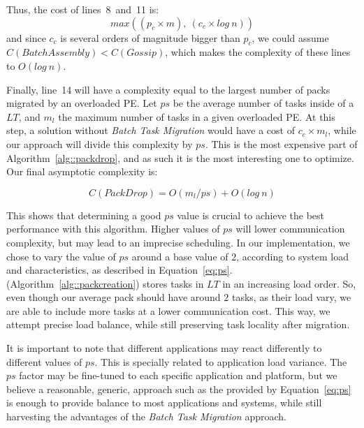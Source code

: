 Thus, the cost of lines~8~and~11 is:
\begin{equation}
 max((p_c\times m),\ (c_c\times log\ n))
\end{equation}
and since $c_c$ is several orders of magnitude bigger than $p_c$, we could assume $C(BatchAssembly)< C(Gossip)$, which makes the 
complexity of these lines to $O(log\ n)$.

Finally, line~14 will have a complexity equal to the largest number of packs migrated by an overloaded PE.
Let $ps$ be the average number of tasks inside of a $LT$, and $m_l$ the maximum number of tasks in a given overloaded PE.
At this step, a solution without \textit{Batch Task Migration} would have a cost of $c_c\times m_l$, while our approach will divide this complexity by $ps$. 
This is the most expensive part of Algorithm~\ref{alg::packdrop}, and as such it is the most interesting one to optimize.
Our final asymptotic complexity is:

\begin{equation}
 C(PackDrop) = O(m_l/ps) + O(log\ n)
 \label{eq:worstcase}
\end{equation}

This shows that determining a good $ps$ value is crucial to achieve the best performance with this algorithm.
Higher values of $ps$ will lower communication complexity, but may lead to an imprecise scheduling.
In our implementation, we chose to vary the value of $ps$ around a base value of $2$, according to system load and characteristics, as described in Equation~\ref{eq:ps}.
\batchassembly (Algorithm~\ref{alg::packcreation}) stores tasks in $LT$ in an increasing load order.
So, even though our average pack should have around $2$ tasks, as their load vary, we are able to include more tasks at a lower communication cost.
This way, we attempt precise load balance, while still preserving task locality after migration.

It is important to note that different applications may react differently to different values of $ps$.
This is specially related to application load variance.
The $ps$ factor may be fine-tuned to each specific application and platform, but we believe a reasonable, generic, approach such as the provided by Equation~\ref{eq:ps} is enough to provide balance to most applications and systems, while still harvesting the advantages of the \textit{Batch Task Migration} approach.
